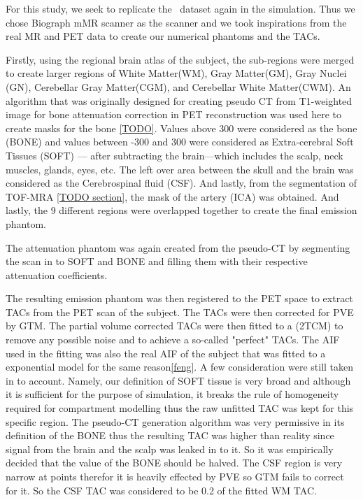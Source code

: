 For this study, we seek to replicate the \fdg$\,$ dataset again in the simulation.
Thus we chose Biograph mMR scanner as the scanner and we took inspirations from the real MR and PET data to create our numerical phantoms and the TACs.

Firstly, using the regional brain atlas of the subject, the sub-regions were merged to create larger regions of White Matter(WM), Gray Matter(GM), Gray Nuclei (GN), Cerebellar Gray Matter(CGM), and Cerebellar White Matter(CWM).
An algorithm that was originally designed for creating pseudo CT from T1-weighted image for bone attenuation correction in PET reconstruction was used here to create masks for the bone \ref{TODO}.
Values above 300 were considered as the bone (BONE) and values between -300 and 300 were considered as Extra-cerebral Soft Tissues (SOFT) --- after subtracting the brain---which includes the scalp, neck muscles, glands, eyes, etc.
The left over area between the skull and the brain was considered as the Cerebrospinal fluid (CSF).
And lastly, from the segmentation of TOF-MRA \ref{TODO section}, the mask of the artery (ICA) was obtained.
And lastly, the 9 different regions were overlapped together to create the final emission phantom.

The attenuation phantom was again created from the pseudo-CT by segmenting the scan in to SOFT and BONE and filling them with their respective attenuation coefficients.

The resulting emission phantom was then registered to the PET space to extract TACs from the PET scan of the subject.
The TACs were then corrected for PVE by GTM.
The partial volume corrected TACs were then fitted to a (2TCM) to remove any possible noise and to achieve a so-called "perfect" TACs.
The AIF used in the fitting was also the real AIF of the subject that was fitted to a exponential model for the same reason\ref{feng}.
A few consideration were still taken in to account.
Namely, our definition of SOFT tissue is very broad and although it is sufficient for the purpose of simulation, it breaks the rule of homogeneity required for compartment modelling thus the raw unfitted TAC was kept for this specific region.
The pseudo-CT generation algorithm was very permissive in its definition of the BONE thus the resulting TAC was higher than reality since signal from the brain and the scalp was leaked in to it.
So it was empirically decided that the value of the BONE should be halved.
The CSF region is very narrow at points therefor it is heavily effected by PVE so GTM fails to correct for it.
So the CSF TAC was considered to be 0.2 of the fitted WM TAC.

